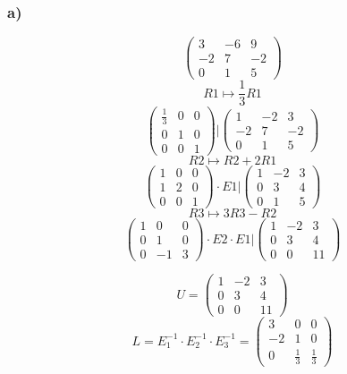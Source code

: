 \documentclass[10pt,a4paper]{article}
\begin{document}
\subsubsection*{a)}
\[
\begin{pmatrix}
3 & -6 & 9\\
-2 & 7 & -2\\
0 & 1 & 5
\end{pmatrix}
\]
\[ R1 \longmapsto \frac{1}{3} R1 \]
\[
\left.\begin{pmatrix}
\frac{1}{3} & 0 & 0\\
0 & 1 & 0\\
0 & 0 & 1
\end{pmatrix}
\right.\Bigg|
\begin{pmatrix}
1 & -2 & 3\\
-2 & 7 & -2\\
0 & 1 & 5
\end{pmatrix}
\]
\[ R2 \longmapsto R2 + 2R1 \]
\[
\left.\begin{pmatrix}
1 & 0 & 0\\
1 & 2 & 0\\
0 & 0 & 1
\end{pmatrix}
\cdot E1
\right.\Bigg|
\begin{pmatrix}
1 & -2 & 3\\
0 & 3 & 4\\
0 & 1 & 5
\end{pmatrix}
\]
\[ R3 \longmapsto 3R3 - R2 \]
\[
\left.\begin{pmatrix}
1 & 0 & 0\\
0 & 1 & 0\\
0 & -1 & 3
\end{pmatrix}
\cdot E2 \cdot E1
\right.\Bigg|
\begin{pmatrix}
1 & -2 & 3\\
0 & 3 & 4\\
0 & 0 & 11
\end{pmatrix}
\]

\[ U = 
\begin{pmatrix}
1 & -2 & 3\\
0 & 3 & 4\\
0 & 0 & 11
\end{pmatrix}
\]
\[ L = E_1^{-1} \cdot E_2^{-1} \cdot E_3^{-1}
= \begin{pmatrix}
3 & 0 & 0\\
-2 & 1 & 0\\
0 & \frac{1}{3} & \frac{1}{3}
\end{pmatrix}
\]
\end{document}
